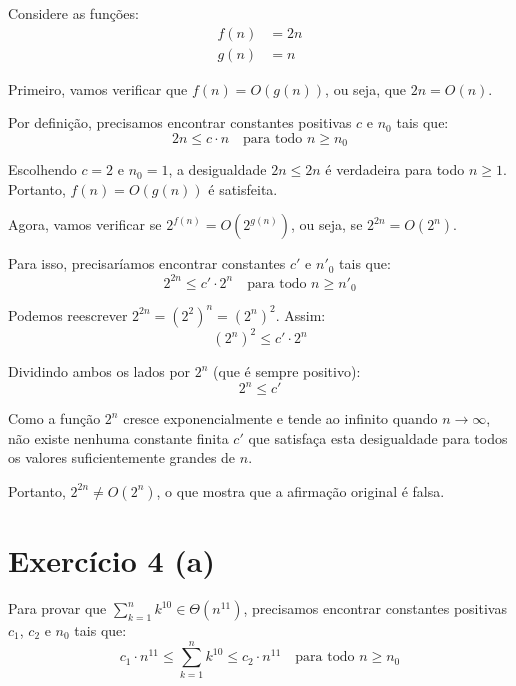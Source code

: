 \documentclass[a4paper,12pt]{article}
\begin{document}
Considere as funções:
\begin{align}
    f(n) &= 2n \\
    g(n) &= n
\end{align}

Primeiro, vamos verificar que $f(n) = O(g(n))$, ou seja, que $2n = O(n)$.

Por definição, precisamos encontrar constantes positivas $c$ e $n_0$ tais que:
\begin{equation}
    2n \leq c \cdot n \quad \text{para todo } n \geq n_0
\end{equation}

Escolhendo $c = 2$ e $n_0 = 1$, a desigualdade $2n \leq 2n$ é verdadeira para todo $n \geq 1$. Portanto, $f(n) = O(g(n))$ é satisfeita.

Agora, vamos verificar se $2^{f(n)} = O(2^{g(n)})$, ou seja, se $2^{2n} = O(2^n)$.

Para isso, precisaríamos encontrar constantes $c'$ e $n'_0$ tais que:
\begin{equation}
    2^{2n} \leq c' \cdot 2^n \quad \text{para todo } n \geq n'_0
\end{equation}

Podemos reescrever $2^{2n} = (2^2)^n = (2^n)^2$. Assim:
\begin{equation}
    (2^n)^2 \leq c' \cdot 2^n
\end{equation}

Dividindo ambos os lados por $2^n$ (que é sempre positivo):
\begin{equation}
    2^n \leq c'
\end{equation}

Como a função $2^n$ cresce exponencialmente e tende ao infinito quando $n \to \infty$, não existe nenhuma constante finita $c'$ que satisfaça esta desigualdade para todos os valores suficientemente grandes de $n$.

Portanto, $2^{2n} \neq O(2^n)$, o que mostra que a afirmação original é falsa.
\newpage
\section*{Exercício 4 (a)}

Para provar que $\sum_{k=1}^{n} k^{10} \in \Theta(n^{11})$, precisamos encontrar constantes positivas $c_1$, $c_2$ e $n_0$ tais que:
\begin{equation}
    c_1 \cdot n^{11} \leq \sum_{k=1}^{n} k^{10} \leq c_2 \cdot n^{11} \quad \text{para todo } n \geq n_0
\end{equation}
\end{document}

